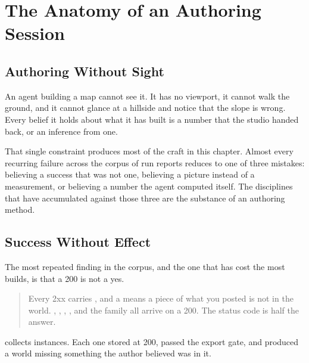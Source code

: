 \chapter{The Anatomy of an Authoring Session}
\label{ch:session}

\section{Authoring Without Sight}

An agent building a map cannot see it. It has no viewport, it cannot walk the
ground, and it cannot glance at a hillside and notice that the slope is wrong.
Every belief it holds about what it has built is a number that the studio handed
back, or an inference from one.

That single constraint produces most of the craft in this chapter. Almost every
recurring failure across the corpus of run reports reduces to one of three
mistakes: believing a success that was not one, believing a picture instead of a
measurement, or believing a number the agent computed itself. The disciplines that
have accumulated against those three are the substance of an authoring method.

\section{Success Without Effect}

The most repeated finding in the corpus, and the one that has cost the most
builds, is that a 200 is not a yes.

\begin{quote}
Every 2xx carries , and a  means a piece of what you
posted is not in the world. , , , , 
and the  family all arrive on a 200. The status code is half the answer.
\end{quote}

 collects instances. Each one stored at 200, passed the export
gate, and produced a world missing something the author believed was in it.

